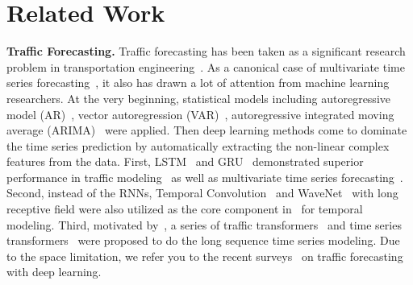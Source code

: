 \documentclass[letterpaper]{article} \usepackage{aaai23}  \usepackage{times}  \usepackage{helvet}  \usepackage{courier}  \usepackage[hyphens]{url}  \usepackage{graphicx} \urlstyle{rm} \def\UrlFont{\rm}  \usepackage{natbib}  \usepackage{caption} \usepackage{multirow}
\begin{document}
\section{Related Work}
\noindent\textbf{Traffic Forecasting.} Traffic forecasting has been taken as a significant research problem in transportation engineering~\cite{huang2014deep,lv2014traffic,ma2015large}. As a canonical case of multivariate time series forecasting~\cite{lai2018modeling}, it also has drawn a lot of attention from machine learning researchers. At the very beginning, statistical models including autoregressive model (AR)~\cite{hamilton1994autoregressive}, vector autoregression (VAR)~\cite{stock2001vector}, autoregressive integrated moving average (ARIMA)~\cite{pan2012utilizing} were applied. Then deep learning methods come to dominate the time series prediction by automatically extracting the non-linear complex features from the data. First, LSTM~\cite{hochreiter1997long} and GRU~\cite{chung2014empirical} demonstrated superior performance in traffic modeling~\cite{ma2015long,lv2018lc,li2018diffusion,zhao2019t,wang2020traffic,bai2020adaptive,ye2021coupled,shang2021discrete,lee2021learning} as well as multivariate time series forecasting~\cite{lai2018modeling,shih2019temporal}. Second, instead of the RNNs, Temporal Convolution~\cite{yu2015multi} and WaveNet~\cite{oord2016wavenet} with long receptive field were also utilized as the core component in~\cite{yu2018spatio,wu2019graph,wu2020connecting,lu2020spatiotemporal,deng2021st} for temporal modeling. Third, motivated by~\cite{vaswani2017attention}, a series of traffic transformers~\cite{zheng2020gman,xu2020spatial} and time series transformers~\cite{li2019enhancing,zhou2021informer,xu2021autoformer} were proposed to do the long sequence time series modeling. Due to the space limitation, we refer you to the recent surveys~\cite{jiang2021dl,jiang2021graph,li2021dynamic} on traffic forecasting with deep learning.
\end{document}
